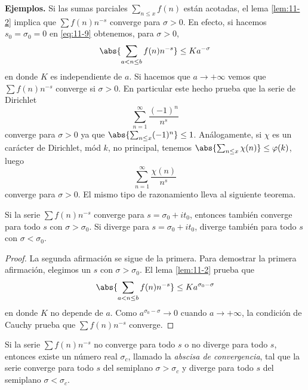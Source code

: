 \documentclass[12pt,a4paper]{book}
\begin{document}
    \textbf{Ejemplos.} Si las sumas parciales $\sum_{n\leq x}f(n)$ están acotadas, el lema
    \ref{lem:11-2} implica que $\sum f(n)n^{-s}$ converge para $\sigma>0$. En efecto, si
    hacemos $s_{0}=\sigma_{0}=0$ en \eqref{eq:11-9} obtenemos, para $\sigma>0$,
    \begin{equation*}
        \abs{\sum_{a<n\leq b}f(n)n^{-s}}\leq Ka^{-\sigma}
    \end{equation*}
    en donde $K$ es independiente de $a$. Si hacemos que $a\to+\infty$ vemos que
    $\sum f(n)n^{-s}$ converge si $\sigma>0$. En particular este hecho prueba que la serie de
    Dirichlet
    \begin{equation*}
        \sum_{n=1}^{\infty}\frac{(-1)^{n}}{n^{s}}
    \end{equation*}
    converge para $\sigma>0$ ya que $\abs{\sum_{n\leq x}(-1)^{n}}\leq1$. Análogamente, si
    $\chi$ es un carácter de Dirichlet, mód $k$, no principal, tenemos
    $\abs{\sum_{n\leq x}\chi(n)}\leq\varphi(k)$, luego
    \begin{equation*}
        \sum_{n=1}^{\infty}\frac{\chi(n)}{n^{s}}
    \end{equation*}
    converge para $\sigma>0$. El mismo tipo de razonamiento lleva al siguiente teorema.

    \begin{teorema}\label{teo:11-8}
        Si la serie $\sum f(n)n^{-s}$ converge para $s=\sigma_{0}+it_{0}$, entonces también
        converge para todo $s$ con $\sigma>\sigma_{0}$. Si diverge para $s=\sigma_{0}+it_{0}$,
        diverge también para todo $s$ con $\sigma<\sigma_{0}$.
    \end{teorema}

    \begin{proof}
        La segunda afirmación se sigue de la primera. Para demostrar la primera afirmación,
        elegimos un $s$ con $\sigma>\sigma_{0}$. El lema \ref{lem:11-2} prueba que
        \begin{equation*}
            \abs{\sum_{a<n\leq b}f(n)n^{-s}}\leq Ka^{\sigma_{0}-\sigma}
        \end{equation*}
        en donde $K$ no depende de $a$. Como $a^{\sigma_{0}-\sigma}\to0$ cuando $a\to+\infty$,
        la condición de Cauchy prueba que $\sum f(n)n^{-s}$ converge.
    \end{proof}

    \begin{teorema}\label{teo:11-9}
        Si la serie $\sum f(n)n^{-s}$ no converge para todo $s$ o no diverge para todo $s$,
        entonces existe un número real $\sigma_{c}$, llamado la \textit{abscisa de
        convergencia}, tal que la serie converge para todo $s$ del semiplano $\sigma>\sigma_{c}$
        y diverge para todo $s$ del semiplano $\sigma<\sigma_{c}$.
    \end{teorema}
\end{document}
